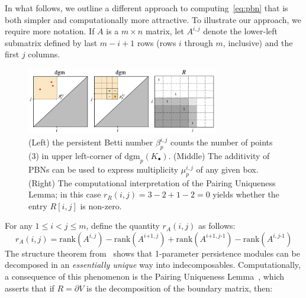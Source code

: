 \documentclass[10pt]{article}
\newcommand{\+}{%
	\raisebox{0.18ex}{\scaleobj{0.55}{+}}
}
\begin{document}
In what follows, we outline a different approach to computing~\eqref{eq:pbn} that is both simpler and computationally more attractive. 
To illustrate our approach, we require more notation. If $A$ is a $m \times n$ matrix, let $A^{i, j}$ denote the lower-left submatrix defined by last $m - i + 1$ rows (rows $i$ through $m$, inclusive) and the first $j$ columns. 
\begin{figure}
\centering
	\includegraphics[width=0.75\textwidth]{fig1}
	\caption{(Left) the persistent Betti number $\beta_p^{i,j}$ counts the number of points (3) in upper left-corner of $\mathrm{dgm}_p(K_\bullet)$. (Middle) The additivity of PBNs can be used to express multiplicity $\mu_p^{i,j}$ of any given box. (Right) The computational interpretation of the Pairing Uniqueness Lemma; in this case $r_R(i,j) = 3 - 2 + 1 - 2 = 0$ yields whether the entry $R[i,j]$ is non-zero.}
	\label{fig:mult}
\end{figure}
For any $1 \leq i < j \leq m$, define the quantity $r_A(i,j)$ as follows:
\begin{equation}
	r_A(i,j) = \mathrm{rank}(A^{i,j}) - \mathrm{rank}(A^{i\texttt{+}1,j}) + \mathrm{rank}(A^{i\texttt{+}1,j\text{-}1}) - \mathrm{rank}(A^{i,j\text{-}1})
\end{equation}
The structure theorem from~\cite{zomorodian2004computing} shows that 1-parameter persistence modules can be decomposed in an \emph{essentially unique} way into indecomposables. Computationally, a consequence of this phenomenon is the Pairing Uniqueness Lemma~\cite{cohen2006vines}, which asserts that if $R = \partial V$ is the decomposition of the boundary matrix, then:  
\end{document}
